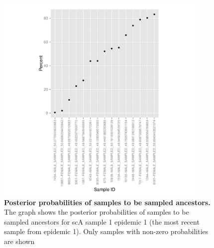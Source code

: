 \documentclass[12pt]{article}
\begin{document}
\begin{center} 
\begin{figure}[!h]
\includegraphics[width=4in]{sa_graph_scA}
\caption{\footnotesize {\bf Posterior probabilities of samples to be sampled ancestors.} 
The graph shows the posterior probabilities of samples to be sampled ancestors for scA sample 1 epidemic 1 (the most recent sample from epidemic 1). Only samples with non-zero probabilities are shown} 
\label{fig: SA} 
\end{figure}
\end{center} 
\end{document}
